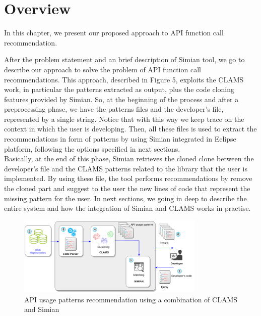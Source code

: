 


\section{Overview}

In this chapter, we present our proposed approach to API function call recommendation.

After the problem statement and an brief description of Simian tool, we go to describe our approach to solve the problem of API function call recommendations. This approach, described in Figure 5, exploits the CLAMS work, in particular the patterns extracted as output, plus the code cloning features provided by Simian. So, at the beginning of the process and after a preprocessing phase, we have the patterns files and the developer's file, represented by a single string. Notice that with this way we keep trace on the context in which the user is developing. Then, all these files is used to extract the recommendations in form of patterns by using Simian integrated in Eclipse platform, following the options specified in next sections. \\
Basically, at the end of this phase, Simian retrieves the cloned clone between the developer's file and the CLAMS patterns related to the library that the user is implemented. By using these file, the tool performs recommendations by remove the cloned part and suggest to the user the new lines of code that represent the missing pattern for the user. In next sections, we going in deep to describe the entire system and how the integration of Simian and CLAMS works in practise. 



\begin{figure}[h!]
	\centering
	\includegraphics[width=0.80\textwidth]{images/APIUsagePatternSimianCLAM.pdf}
	\caption{API usage patterns recommendation using a combination of CLAMS and Simian}	
	\label{fig:APIUsagePatternSimianCLAM}	
\end{figure}




